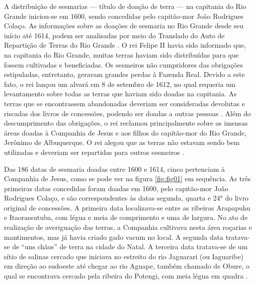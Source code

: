 \begin{refsection}
A distribuição de sesmarias --- título de doação de terra --- na capitania do Rio Grande iniciou-se em 1600, sendo concedidas pelo capitão-mor João Rodrigues Colaço. As informações sobre as doações de sesmaria no Rio Grande desde seu início até 1614, podem ser analisadas por meio do Translado do Auto de Repartição de Terras do Rio Grande \cite{Translado1909}. O rei Felipe II havia sido informado que, na capitania do Rio Grande, muitas terras haviam sido distribuídas para que fossem cultivadas e beneficiadas. Os sesmeiros não cumpridores das obrigações estipuladas, entretanto, geravam grandes perdas à Fazenda Real. Devido a este fato, o rei lançou um alvará em 8 de setembro de 1612, no qual requeria um levantamento sobre todas as terras que haviam sido doadas na capitania. As terras que se encontrassem abandonadas deveriam ser consideradas devolutas e riscadas dos livros de concessões, podendo ser doadas a outras pessoas \cite[p.~7--12]{Translado1909}. Além do descumprimento das obrigações, o rei reclamou principalmente sobre as imensas áreas doadas à Companhia de Jesus e aos filhos do capitão-mor do Rio Grande, Jerônimo de Albuquerque. O rei alegou que as terras não estavam sendo bem utilizadas e deveriam ser repartidas para outros sesmeiros \cite[p.~6--9]{Translado1909}.  

Das 186 datas de sesmaria doadas entre 1600 e 1614, cinco pertenciam à Companhia de Jesus, como se pode ver na figura \ref{fig:fig01} em sequência. As três primeiras datas concedidas foram doadas em 1600, pelo capitão-mor João Rodrigues Colaço, e são correspondentes às datas segunda, quarta e 24° do livro original de concessões. A primeira data localizava-se entre as ribeiras Arapapuhu e Itaorassutuba, com légua e meia de comprimento e uma de largura. No ato de realização de averiguação das terras, a Companhia cultivava nesta área roçarias e mantimentos, mas já havia criado gado vacum no local. A segunda data tratava-se de “uns chãos” de terra na cidade do Natal. A terceira data tratava-se de um sítio de salinas cercado que iniciava no estreito do rio Jaguarari (ou Iaguaribe) em direção ao sudoeste até chegar ao rio Aguape, também chamado de Obure, o qual se encontrava cercado pela ribeira do Potengi, com meia légua em quadra \cite[p.~19,~20~e~25]{Translado1909}.



\end{refsection}
